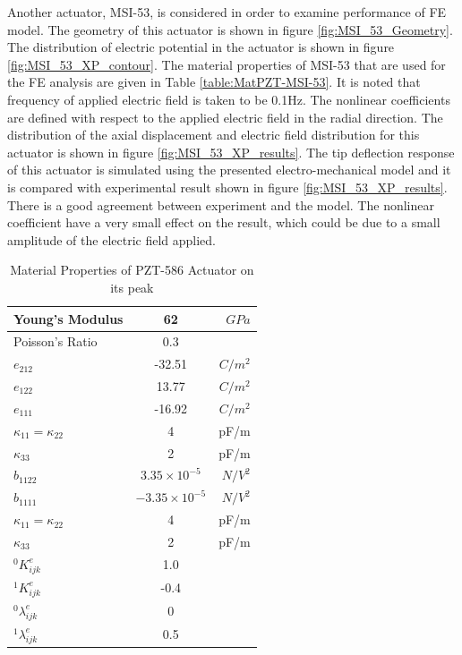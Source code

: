 Another actuator, MSI-53, is considered in order to examine performance of FE model. 
The geometry of this actuator is shown in figure \ref{fig:MSI_53_Geometry}. 
The distribution of electric potential in the actuator is shown in figure \ref{fig:MSI_53_XP_contour}. 
The material properties of MSI-53 that are used for the FE analysis are given in Table \ref{table:MatPZT-MSI-53}. 
It is noted that frequency of applied electric field is taken to be 0.1Hz. 
The nonlinear coefficients are defined with respect to the applied electric field in the radial direction.
The distribution of the axial displacement and electric field distribution for this actuator is shown in figure \ref{fig:MSI_53_XP_results}. 
The tip deflection response of this actuator is simulated using the presented electro-mechanical model and it is compared with experimental result shown in figure \ref{fig:MSI_53_XP_results}. 
There is a good agreement between experiment and the model. 
The nonlinear coefficient have a very small effect on the result, which could be due to a small amplitude of the electric field applied.

\newpage 
 
\begin{table}
\caption{Material Properties of PZT-586 Actuator on its peak\cite{Alexander}}
\centering
\begin{tabular}{|l|c|r|}
\hline 
Young's Modulus&62& $GPa$\\ \hline
Poisson's Ratio&0.3& \\ \hline 
$e_{212}$ &-32.51&$C/m^2$\\ \hline
$e_{122}$ &13.77&$C/m^2$\\ \hline
$e_{111}$ & -16.92&$C/m^2$\\ \hline
$\kappa_{11}=\kappa_{22}$ & 4 &pF/m\\ \hline
$\kappa_{33}$ & 2 &pF/m\\ \hline
$\widehat{b}_{1122}$ & $3.35 \times 10^{-5}$ &  $ N/V^2 $\\ \hline
$\widehat{b}_{1111} $ & $-3.35 \times 10^{-5}$ &$ N/V^2 $\\ \hline
$\kappa_{11}=\kappa_{22}$ & 4 &pF/m\\ \hline
$\kappa_{33}$ & 2 &pF/m\\ \hline
${}^{0}K_{ijk}^{e}$&1.0&\\ \hline
${}^{1}K_{ijk}^{e}$&-0.4&\\ \hline
${}^{0}\lambda_{ijk}^{e}$&0&\\ \hline
${}^{1}\lambda_{ijk}^{e}$&0.5&\\ \hline 
\end{tabular}
\label{table:MatPZT-PZT-586}
\end{table}

